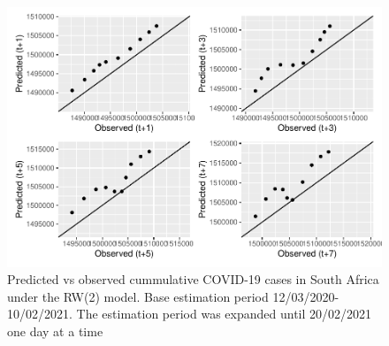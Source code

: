 \documentclass[10pt,letterpaper]{article}
\begin{document}
\begin{figure}[H]
	\includegraphics[width=0.99\linewidth]{COVIDincidenceSA_files/figure-latex/accuracy-1} \caption{Predicted vs observed cummulative COVID-19 cases in South Africa under the RW(2) model. Base estimation period 12/03/2020-10/02/2021. The estimation period was expanded until 20/02/2021 one day at a time}\label{fig:accuracy}
\end{figure}
\end{document}
